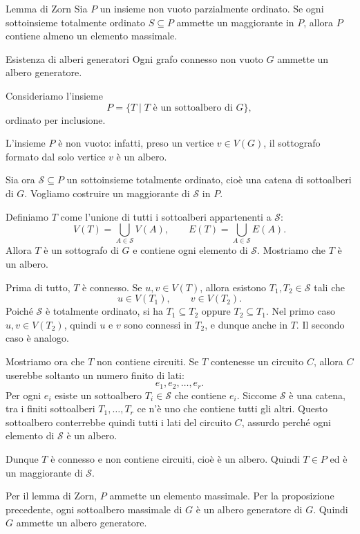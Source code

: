 \documentclass[a4paper]{article}
\begin{document}
\begin{snippettheorem}{Lemma di Zorn}
    Sia \(P\) un insieme non vuoto parzialmente ordinato. Se ogni sottoinsieme totalmente ordinato \(S\subseteq P\) ammette un maggiorante in \(P\), allora \(P\) contiene almeno un elemento massimale.
\end{snippettheorem}

\begin{snippettheorem}{Esistenza di alberi generatori}
    Ogni grafo connesso non vuoto \(G\) ammette un albero generatore.
\end{snippettheorem}

\begin{snippetproof}{}
    Consideriamo l'insieme
    \[
        P=\{T\mid T \text{ è un sottoalbero di }G\},
    \]
    ordinato per inclusione.

    L'insieme \(P\) è non vuoto: infatti, preso un vertice \(v\in V(G)\), il sottografo formato dal solo vertice \(v\) è un albero.

    Sia ora \(\mathcal{S}\subseteq P\) un sottoinsieme totalmente ordinato, cioè una catena di sottoalberi di \(G\). Vogliamo costruire un maggiorante di \(\mathcal{S}\) in \(P\).

    Definiamo \(T\) come l'unione di tutti i sottoalberi appartenenti a \(\mathcal{S}\):
    \[
        V(T)=\bigcup_{A\in\mathcal{S}} V(A),
        \qquad
        E(T)=\bigcup_{A\in\mathcal{S}} E(A).
    \]
    Allora \(T\) è un sottografo di \(G\) e contiene ogni elemento di \(\mathcal{S}\). Mostriamo che \(T\) è un albero.

    Prima di tutto, \(T\) è connesso. Se \(u,v\in V(T)\), allora esistono \(T_1,T_2\in\mathcal{S}\) tali che
    \[
        u\in V(T_1),
        \qquad
        v\in V(T_2).
    \]
    Poiché \(\mathcal{S}\) è totalmente ordinato, si ha \(T_1\subseteq T_2\) oppure \(T_2\subseteq T_1\). Nel primo caso \(u,v\in V(T_2)\), quindi \(u\) e \(v\) sono connessi in \(T_2\), e dunque anche in \(T\). Il secondo caso è analogo.

    Mostriamo ora che \(T\) non contiene circuiti. Se \(T\) contenesse un circuito \(C\), allora \(C\) userebbe soltanto un numero finito di lati:
    \[
        e_1,e_2,\ldots,e_r.
    \]
    Per ogni \(e_i\) esiste un sottoalbero \(T_i\in\mathcal{S}\) che contiene \(e_i\). Siccome \(\mathcal{S}\) è una catena, tra i finiti sottoalberi \(T_1,\ldots,T_r\) ce n'è uno che contiene tutti gli altri. Questo sottoalbero conterrebbe quindi tutti i lati del circuito \(C\), assurdo perché ogni elemento di \(\mathcal{S}\) è un albero.

    Dunque \(T\) è connesso e non contiene circuiti, cioè è un albero. Quindi \(T\in P\) ed è un maggiorante di \(\mathcal{S}\).

    Per il lemma di Zorn, \(P\) ammette un elemento massimale. Per la proposizione precedente, ogni sottoalbero massimale di \(G\) è un albero generatore di \(G\). Quindi \(G\) ammette un albero generatore.
\end{snippetproof}
\end{document}
